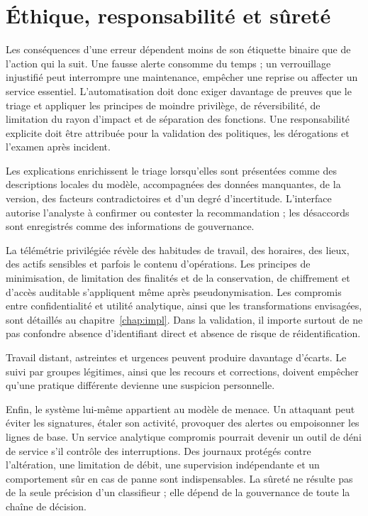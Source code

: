 \documentclass[11pt,a4paper,oneside]{report}
\theoremstyle{definition}
\theoremstyle{plain}
\begin{document}
\section{Éthique, responsabilité et sûreté}
\label{sec:validation-ethics}

Les conséquences d'une erreur dépendent moins de son étiquette binaire que de
l'action qui la suit. Une fausse alerte consomme du temps ; un verrouillage
injustifié peut interrompre une maintenance, empêcher une reprise ou affecter
un service essentiel. L'automatisation doit donc exiger davantage de preuves
que le triage et appliquer les principes de moindre privilège, de
réversibilité, de limitation du rayon d'impact et de séparation des fonctions.
Une responsabilité explicite doit être attribuée pour la validation des
politiques, les dérogations et l'examen après incident.

Les explications enrichissent le triage lorsqu'elles sont présentées comme
des descriptions locales du modèle, accompagnées des données manquantes, de la
version, des facteurs contradictoires et d'un degré d'incertitude. L'interface
autorise l'analyste à confirmer ou contester la recommandation ; les désaccords
sont enregistrés comme des informations de gouvernance.

La télémétrie privilégiée révèle des habitudes de travail, des horaires, des
lieux, des actifs sensibles et parfois le contenu d'opérations. Les principes
de minimisation, de limitation des finalités et de la conservation, de
chiffrement et d'accès auditable s'appliquent même après pseudonymisation. Les
compromis entre confidentialité et utilité analytique, ainsi que les
transformations envisagées, sont détaillés au chapitre~\ref{chap:impl}. Dans la
validation, il importe surtout de ne pas confondre absence d'identifiant direct
et absence de risque de réidentification.

Travail distant, astreintes et urgences peuvent produire davantage d'écarts.
Le suivi par groupes légitimes, ainsi que les recours et corrections, doivent
empêcher qu'une pratique différente devienne une suspicion personnelle.

Enfin, le système lui-même appartient au modèle de menace. Un attaquant peut
éviter les signatures, étaler son activité, provoquer des alertes ou empoisonner
les lignes de base. Un service analytique compromis pourrait devenir un outil
de déni de service s'il contrôle des interruptions. Des journaux protégés
contre l'altération, une limitation de débit, une supervision indépendante et
un comportement sûr en cas de panne sont indispensables. La sûreté ne résulte
pas de la seule précision d'un classifieur ; elle dépend de la gouvernance de
toute la chaîne de décision.
\end{document}
